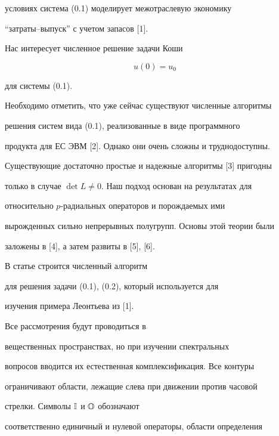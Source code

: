 условиях система (0.1) моделирует межотраслевую экономику


``затраты--выпуск'' с учетом запасов [1].


Нас интересует численное решение задачи Коши


\begin{equation}


u(0) = u_0


\tag{0.2}


\end{equation}


для системы (0.1).








Необходимо отметить, что уже сейчас существуют численные алгоритмы


решения систем вида (0.1), реализованные в виде программного


продукта для ЕС ЭВМ [2]. Однако они очень сложны и труднодоступны.


Существующие достаточно простые и надежные алгоритмы [3] пригодны


только в случае $\det L \neq 0$. Наш подход основан на результатах для


относительно $p$-радиальных операторов и порождаемых ими


вырожденных сильно непрерывных полугрупп. Основы этой теории были


заложены в [4], а затем развиты в [5], [6].





В статье строится численный алгоритм


для решения задачи (0.1), (0.2), который используется для


изучения примера Леонтьева из [1].





Все рассмотрения будут проводиться в


вещественных пространствах, но при изучении спектральных


вопросов вводится их естественная комплексификация. Все контуры


ограничивают области, лежащие слева при движении против часовой


стрелки. Символы ${\Bbb I}$ и ${\Bbb O}$ обозначают


соответственно единичный и нулевой операторы, области определения


